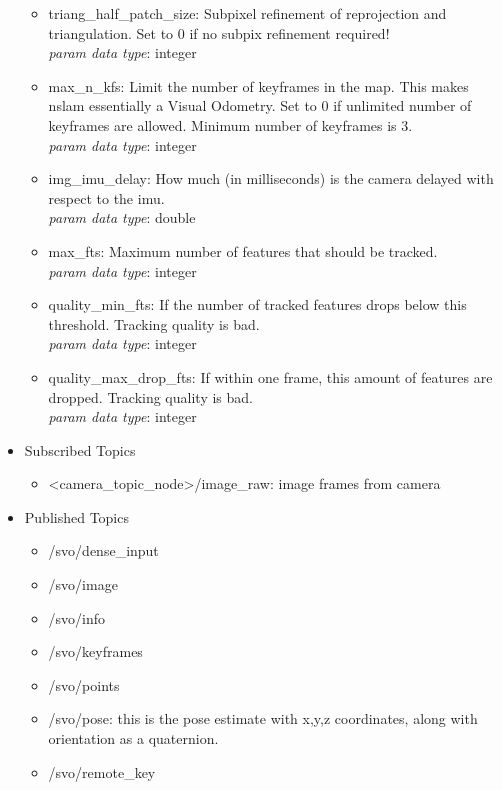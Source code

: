 \begin{itemize}
\begin{itemize}
\item triang\_half\_patch\_size:	Subpixel refinement of reprojection and triangulation. Set to 0 if no subpix refinement required! \\
\textit{param data type}: integer

\item  max\_n\_kfs:	Limit the number of keyframes in the map. This makes nslam essentially a Visual Odometry. Set to 0 if unlimited number of keyframes are allowed. Minimum number of keyframes is 3. \\
\textit{param data type}: integer

\item img\_imu\_delay: How much (in milliseconds) is the camera delayed with respect to the imu. \\
\textit{param data type}: double

\item max\_fts: Maximum number of features that should be tracked.	 \\
\textit{param data type}: integer

\item quality\_min\_fts:	 If the number of tracked features drops below this threshold. Tracking quality is bad. \\
\textit{param data type}: integer

\item quality\_max\_drop\_fts: If within one frame, this amount of features are dropped. Tracking quality is bad. \\
\textit{param data type}: integer
\end{itemize}

\item Subscribed Topics
\begin{itemize}
\item <camera\_topic\_node>/image\_raw: image frames from camera
\end{itemize}
\item Published Topics
\begin{itemize}
\item /svo/dense\_input
\item /svo/image
\item /svo/info
\item /svo/keyframes
\item /svo/points
\item /svo/pose: this is the pose estimate with x,y,z coordinates, along with orientation as a quaternion. 
\item /svo/remote\_key


\end{itemize}
\end{itemize}
